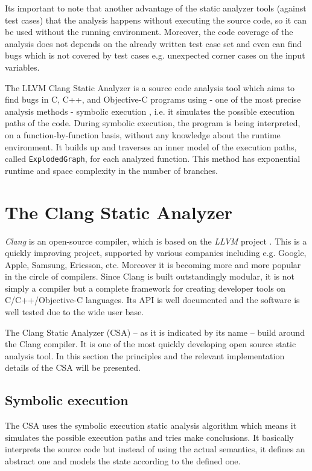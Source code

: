\documentclass[oneside, a4paper, 12pt]{article}
\theoremstyle{definition}
\begin{document}
Its important to note that another advantage of the static analyzer tools 
(against test cases) that the analysis happens without executing the source 
code, so it can be used without the running environment. Moreover, the code 
coverage of the analysis does not depends on the already written test case set 
and even can find bugs which is not covered by test cases e.g. unexpected 
corner cases on the input variables. 

The LLVM Clang Static Analyzer is a source code analysis tool which aims to 
find bugs in C,
C++, and Objective-C programs using - one of the most precise analysis methods 
- symbolic execution  \cite{King1975} \cite{Hampapuram2005}, i.e. it simulates 
the possible execution paths of the code. During symbolic execution, the 
program is being interpreted, on a function-by-function basis, without any 
knowledge about the runtime environment. It builds up and traverses an inner 
model of the execution paths, called \texttt{ExplodedGraph}, for each analyzed 
function. This method has exponential runtime and space complexity in the 
number of branches.


\section{The Clang Static Analyzer}

\emph{Clang} is an open-source compiler, which is based on the \emph{LLVM} 
project \cite{lattner:clang}. This is a quickly improving project, 
supported by various companies including e.g. Google, Apple, Samsung, Ericsson, 
etc. Moreover it is becoming more and more popular in the circle of compilers. 
Since Clang is built outstandingly modular, it is not simply a compiler but a 
complete framework for creating developer tools on C/C++/Objective-C 
languages. Its API is well documented and the software is well tested due to 
the wide user base.


The Clang Static Analyzer (CSA) -- as it is indicated by its name -- build 
around the Clang compiler. It is one of the most quickly developing open source 
static analysis tool. In this section the principles and the relevant 
implementation details of the CSA will be presented.
\subsection{Symbolic execution}
The CSA uses the symbolic execution static analysis algorithm which means it 
simulates the possible execution paths and tries make conclusions. It basically 
interprets the source code but instead of using the actual semantics, it 
defines an abstract one and models the state according to the defined one.
\end{document}
